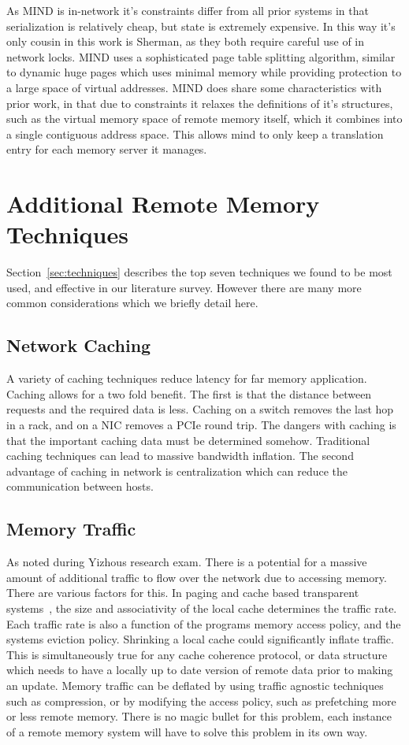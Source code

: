 As MIND is in-network it's constraints differ from all prior systems in that
serialization is relatively cheap, but state is extremely expensive. In this way
it's only cousin in this work is Sherman, as they both require careful use of in
network locks. MIND uses a sophisticated page table splitting algorithm, similar
to dynamic huge pages which uses minimal memory while providing protection to a
large space of virtual addresses. MIND does share some characteristics with
prior work, in that due to constraints it relaxes the definitions of it's
structures, such as the virtual memory space of remote memory itself, which it
combines into a single contiguous address space. This allows mind to only keep a
translation entry for each memory server it manages.

\section{Additional Remote Memory Techniques}
\label{sec:additional}

Section~\ref{sec:techniques} describes the top seven techniques we found to be
most used, and effective in our literature survey. However there are many more
common considerations which we briefly detail here.

\subsection{Network Caching} A variety of caching techniques reduce latency for far memory
application. Caching allows for a two fold benefit. The first is that the
distance between requests and the required data is less. Caching on a switch
removes the last hop in a rack, and on a NIC removes a PCIe round trip. The
dangers with caching is that the important caching data must be determined
somehow. Traditional caching techniques can lead to massive bandwidth inflation.
The second advantage of caching in network is centralization which can reduce
the communication between hosts.

\subsection{Memory Traffic} As noted during Yizhous research exam. There is a
potential for a massive amount of additional traffic to flow over the network
due to accessing memory. There are various factors for this. In paging and cache
based transparent systems~\cite{fastswap,kona,gms,infiniswap,legoos,lite}, the
size and associativity of the local cache determines the traffic rate. Each
traffic rate is also a function of the programs memory access policy, and the
systems eviction policy. Shrinking a local cache could significantly inflate
traffic. This is simultaneously true for any cache coherence protocol, or data
structure which needs to have a locally up to date version of remote data prior
to making an update. Memory traffic can be deflated by using traffic agnostic
techniques such as compression, or by modifying the access policy, such as
prefetching more or less remote memory. There is no magic bullet for this
problem, each instance of a remote memory system will have to solve this problem
in its own way.

